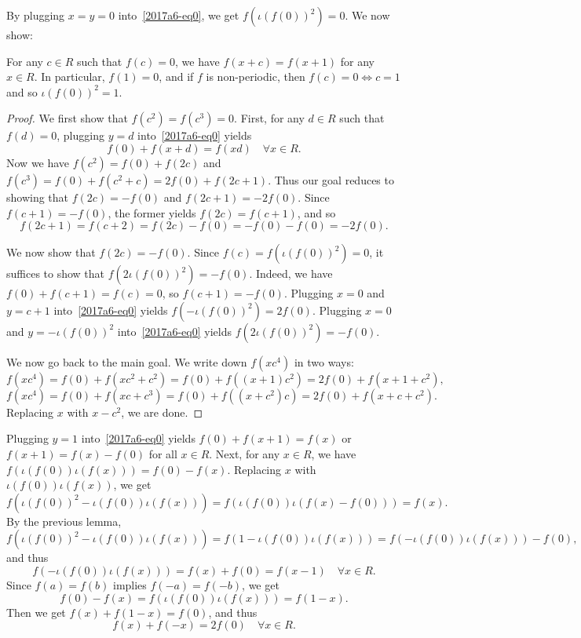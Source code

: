 By plugging $x = y = 0$ into~\eqref{2017a6-eq0}, we get $f(\iota(f(0))^2) = 0$.
We now show:

\begin{theorem}
For any $c \in R$ such that $f(c) = 0$, we have $f(x + c) = f(x + 1)$ for any $x \in R$.
In particular, $f(1) = 0$, and if $f$ is non-periodic, then $f(c) = 0 \iff c = 1$ and so $\iota(f(0))^2 = 1$.
\end{theorem}
\begin{proof}
We first show that $f(c^2) = f(c^3) = 0$.
First, for any $d \in R$ such that $f(d) = 0$, plugging $y = d$ into~\eqref{2017a6-eq0} yields
\[ f(0) + f(x + d) = f(xd) \quad \forall x \in R. \]
Now we have $f(c^2) = f(0) + f(2c)$ and $f(c^3) = f(0) + f(c^2 + c) = 2 f(0) + f(2c + 1)$.
Thus our goal reduces to showing that $f(2c) = -f(0)$ and $f(2c + 1) = -2 f(0)$.
Since $f(c + 1) = -f(0)$, the former yields $f(2c) = f(c + 1)$, and so
\[ f(2c + 1) = f(c + 2) = f(2c) - f(0) = -f(0) - f(0) = -2 f(0). \]

We now show that $f(2c) = -f(0)$.
Since $f(c) = f(\iota(f(0))^2) = 0$, it suffices to show that $f(2 \iota(f(0))^2) = -f(0)$.
Indeed, we have $f(0) + f(c + 1) = f(c) = 0$, so $f(c + 1) = -f(0)$.
Plugging $x = 0$ and $y = c + 1$ into~\eqref{2017a6-eq0} yields $f(- \iota(f(0))^2) = 2 f(0)$.
Plugging $x = 0$ and $y = -\iota(f(0))^2$ into~\eqref{2017a6-eq0} yields $f(2 \iota(f(0))^2) = -f(0)$.

We now go back to the main goal.
We write down $f(xc^4)$ in two ways:
\[ f(xc^4) = f(0) + f(xc^2 + c^2) = f(0) + f((x + 1) c^2) = 2 f(0) + f(x + 1 + c^2), \]
\[ f(xc^4) = f(0) + f(xc + c^3) = f(0) + f((x + c^2) c) = 2 f(0) + f(x + c + c^2). \]
Replacing $x$ with $x - c^2$, we are done.
\end{proof}

Plugging $y = 1$ into~\eqref{2017a6-eq0} yields $f(0) + f(x + 1) = f(x)$ or $f(x + 1) = f(x) - f(0)$ for all $x \in R$.
Next, for any $x \in R$, we have $f(\iota(f(0)) \iota(f(x))) = f(0) - f(x)$.
Replacing $x$ with $\iota(f(0)) \iota(f(x))$, we get
\[ f(\iota(f(0))^2 - \iota(f(0)) \iota(f(x))) = f(\iota(f(0)) \iota(f(x) - f(0))) = f(x). \]
By the previous lemma,
\[ f(\iota(f(0))^2 - \iota(f(0)) \iota(f(x))) = f(1 - \iota(f(0)) \iota(f(x))) = f(-\iota(f(0)) \iota(f(x))) - f(0), \]
    and thus
\[ f(-\iota(f(0)) \iota(f(x))) = f(x) + f(0) = f(x - 1) \quad \forall x \in R. \tag{1.1}\label{2017a6-eq-basic1} \]
Since $f(a) = f(b)$ implies $f(-a) = f(-b)$, we get
\[ f(0) - f(x) = f(\iota(f(0)) \iota(f(x))) = f(1 - x). \tag{1.2}\label{2017a6-eq-basic2} \]
Then we get $f(x) + f(1 - x) = f(0)$, and thus
\[ f(x) + f(-x) = 2 f(0) \quad \forall x \in R. \tag{1.3}\label{2017a6-eq-basic3} \]

